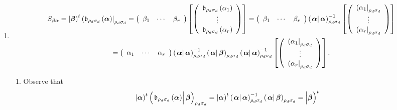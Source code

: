 \documentclass[aps,preprint]{revtex4}
\begin{document}
\begin{enumerate}
\begin{enumerate}
\item 
\begin{gather}
S_{\beta \alpha }=\left\vert \boldsymbol{\beta }\right) ^{t}\left( \mathfrak{%
b}_{\rho _{d}\sigma _{d}}\left( \boldsymbol{\alpha }\right) \right\vert
_{\rho _{d}\sigma _{d}}=\left( 
\begin{array}{ccc}
\beta _{1} & \cdots & \beta _{r}%
\end{array}%
\right) \left[ \left( 
\begin{array}{c}
\mathfrak{b}_{\rho _{d}\sigma _{d}}\left( \alpha _{1}\right) \\ 
\vdots \\ 
\mathfrak{b}_{\rho _{d}\sigma _{d}}\left( \alpha _{r}\right)%
\end{array}%
\right) \right] =\left( 
\begin{array}{ccc}
\beta _{1} & \cdots & \beta _{r}%
\end{array}%
\right) \left( \left. \boldsymbol{\alpha }\right\vert \boldsymbol{\alpha }%
\right) _{\rho _{d}\sigma _{d}}^{-1}\left[ \left( 
\begin{array}{c}
\left( \alpha _{1}\right\vert _{\rho _{d}\sigma _{d}} \\ 
\vdots \\ 
\left( \alpha _{r}\right\vert _{\rho _{d}\sigma _{d}}%
\end{array}%
\right) \right] \\
=\left( 
\begin{array}{ccc}
\alpha _{1} & \cdots & \alpha _{r}%
\end{array}%
\right) \left( \left. \boldsymbol{\alpha }\right\vert \boldsymbol{\alpha }%
\right) _{\rho _{d}\sigma _{d}}^{-1}\left( \left. \boldsymbol{\alpha }%
\right\vert \boldsymbol{\beta }\right) _{\rho _{d}\sigma _{d}}\left( \left. 
\boldsymbol{\alpha }\right\vert \boldsymbol{\alpha }\right) _{\rho
_{d}\sigma _{d}}^{-1}\left[ \left( 
\begin{array}{c}
\left( \alpha _{1}\right\vert _{\rho _{d}\sigma _{d}} \\ 
\vdots \\ 
\left( \alpha _{r}\right\vert _{\rho _{d}\sigma _{d}}%
\end{array}%
\right) \right] .
\end{gather}

\begin{enumerate}
\item Observe that 
\begin{equation*}
\left\vert \overset{}{\boldsymbol{\alpha }}\right) ^{t}\left( \left. \overset%
{}{\mathfrak{b}_{\rho _{d}\sigma _{d}}\left( \boldsymbol{\alpha }\right) }%
\right\vert \boldsymbol{\beta }\right) _{\rho _{d}\sigma _{d}}=\left\vert 
\overset{}{\boldsymbol{\alpha }}\right) ^{t}\left( \left. \overset{}{%
\boldsymbol{\alpha }}\right\vert \boldsymbol{\alpha }\right) _{\rho
_{d}\sigma _{d}}^{-1}\left( \left. \overset{}{\boldsymbol{\alpha }}%
\right\vert \boldsymbol{\beta }\right) _{\rho _{d}\sigma _{d}}=\left\vert 
\overset{}{\boldsymbol{\beta }}\right) ^{t}
\end{equation*}


\end{enumerate}
\end{enumerate}
\end{enumerate}
\end{document}
